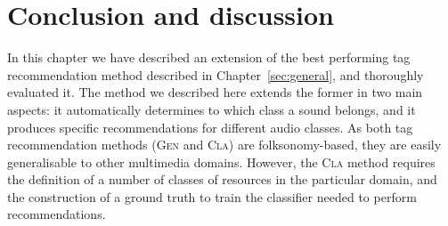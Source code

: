 \section{Conclusion and discussion}
\label{class:sec:discussion}

In this chapter we have described an extension of the best performing tag recommendation method described in Chapter~\ref{sec:general}, and thoroughly evaluated it.
The method we described here extends the former in two main aspects: it automatically determines to which class a sound belongs, and it produces specific recommendations for different audio classes. 
As both tag recommendation methods (\textsc{Gen} and \textsc{Cla}) are folksonomy-based, they are easily generalisable to other multimedia domains. However, the \textsc{Cla} method requires the definition of a number of classes of resources in the particular domain, and the construction of a ground truth to train the classifier needed to perform recommendations. 



